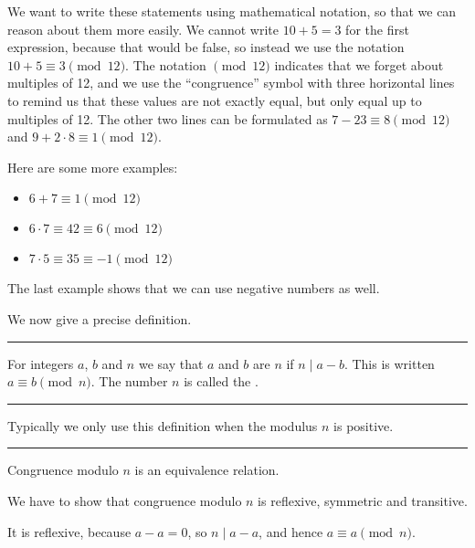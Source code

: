 \documentclass[letterpaper,10pt,english]{sphinxmanual}
\begin{document}
\sphinxAtStartPar
We want to write these statements using mathematical notation, so that we can reason about them more easily. We cannot write \(10 + 5 = 3\) for the first expression, because that would be false, so instead we use the notation \(10 + 5 \equiv 3 \pmod{12}\). The notation \(\pmod{12}\) indicates that we forget about multiples of 12, and we use the “congruence” symbol with three horizontal lines to remind us that these values are not exactly equal, but only equal up to multiples of 12. The other two lines can be formulated as \(7 - 23 \equiv 8 \pmod{12}\) and \(9 + 2 \cdot 8 \equiv 1 \pmod{12}\).

\sphinxAtStartPar
Here are some more examples:
\begin{itemize}
\item {} 
\sphinxAtStartPar
\(6 + 7 \equiv 1 \pmod{12}\)

\item {} 
\sphinxAtStartPar
\(6 \cdot 7 \equiv 42 \equiv 6 \pmod{12}\)

\item {} 
\sphinxAtStartPar
\(7 \cdot 5 \equiv 35 \equiv -1 \pmod{12}\)

\end{itemize}

\sphinxAtStartPar
The last example shows that we can use negative numbers as well.

\sphinxAtStartPar
We now give a precise definition.


\bigskip\hrule\bigskip


\sphinxAtStartPar
{} For integers \(a\), \(b\) and \(n\) we say that \(a\) and \(b\) are  \(n\) if \(n \mid a - b\). This is written \(a \equiv b \pmod{n}\). The number \(n\) is called the .


\bigskip\hrule\bigskip


\sphinxAtStartPar
Typically we only use this definition when the modulus \(n\) is positive.


\bigskip\hrule\bigskip


\sphinxAtStartPar
{} Congruence modulo \(n\) is an equivalence relation.

\sphinxAtStartPar
{} We have to show that congruence modulo \(n\) is reflexive, symmetric and transitive.

\sphinxAtStartPar
It is reflexive, because \(a - a = 0\), so \(n \mid a - a\), and hence \(a\equiv a \pmod{n}\).
\end{document}
